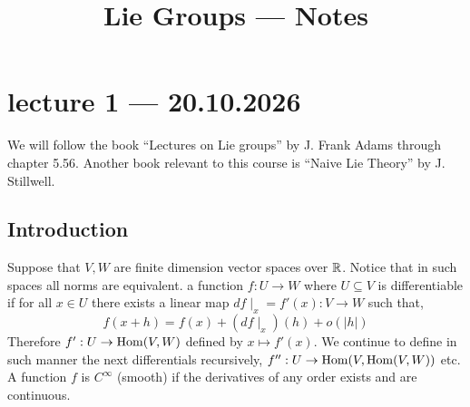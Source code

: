 
\title{Lie Groups --- Notes}
\setcounter{secnumdepth}{2}

\usepackage{fancyhdr}
\pagestyle{fancy}
\renewcommand{\headrulewidth}{0pt}


\maketitle
\maketitleprint[teal]{}

\tableofcontents

\section{lecture 1 --- 20.10.2026}
We will follow the book ``Lectures on Lie groups'' by J. Frank Adams through chapter 5.56.
Another book relevant to this course is ``Naive Lie Theory'' by J. Stillwell.

\subsection{Introduction}
Suppose that $V, W$ are finite dimension vector spaces over $\mathbb{R}$.
Notice that in such spaces all norms are equivalent.
a function $f : U \to W$ where $U \subseteq V$ is differentiable if for all $x \in U$ there exists a linear map $df \mid_x = f'(x) : V \to W$ such that,
\[
	f(x + h)
	= f(x) + (df \mid_x)(h) + o(|h|)
\]
Therefore $f' : U \to \operatorname{Hom}(V, W)$ defined by $x \mapsto f'(x)$.
We continue to define in such manner the next differentials recursively, $f'' : U \to \operatorname{Hom}(V, \operatorname{Hom}(V, W))$ etc.
A function $f$ is $C^\infty$ (smooth) if the derivatives of any order exists and are continuous.

